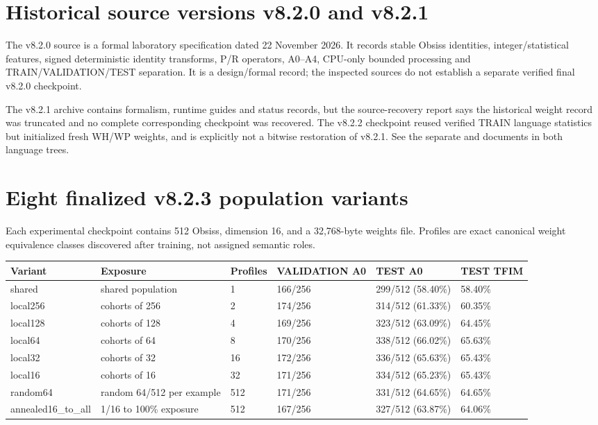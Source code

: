 \documentclass[11pt,a4paper]{report}
\newcommand{\code}[1]{\texttt{\detokenize{#1}}}
\begin{document}
\section{Historical source versions v8.2.0 and v8.2.1}
The v8.2.0 source is a formal laboratory specification dated 22 November 2026. It records stable Obsiss identities, integer/statistical features, signed deterministic identity transforms, P/R operators, A0--A4, CPU-only bounded processing and TRAIN/VALIDATION/TEST separation. It is a design/formal record; the inspected sources do not establish a separate verified final v8.2.0 checkpoint.

The v8.2.1 archive contains formalism, runtime guides and status records, but the source-recovery report says the historical weight record was truncated and no complete corresponding checkpoint was recovered. The v8.2.2 checkpoint reused verified TRAIN language statistics but initialized fresh WH/WP weights, and is explicitly not a bitwise restoration of v8.2.1. See the separate \code{models/eSonde_v8_2_0/} and \code{models/eSonde_v8_2_1/} documents in both language trees.

\section{Eight finalized v8.2.3 population variants}
Each experimental checkpoint contains 512 Obsiss, dimension 16, and a 32,768-byte weights file. Profiles are exact canonical weight equivalence classes discovered after training, not assigned semantic roles.
\begin{longtable}{p{2.8cm}p{3.0cm}p{1.9cm}p{1.9cm}p{1.9cm}p{1.7cm}}
\toprule
Variant & Exposure & Profiles & VALIDATION A0 & TEST A0 & TEST TFIM\\
\midrule
shared & shared population & 1 & 166/256 & 299/512 (58.40\%) & 58.40\%\\
local256 & cohorts of 256 & 2 & 174/256 & 314/512 (61.33\%) & 60.35\%\\
local128 & cohorts of 128 & 4 & 169/256 & 323/512 (63.09\%) & 64.45\%\\
local64 & cohorts of 64 & 8 & 170/256 & 338/512 (66.02\%) & 65.63\%\\
local32 & cohorts of 32 & 16 & 172/256 & 336/512 (65.63\%) & 65.43\%\\
local16 & cohorts of 16 & 32 & 171/256 & 334/512 (65.23\%) & 65.43\%\\
random64 & random 64/512 per example & 512 & 171/256 & 331/512 (64.65\%) & 64.65\%\\
annealed16\_to\_all & 1/16 to 100\% exposure & 512 & 167/256 & 327/512 (63.87\%) & 64.06\%\\
\bottomrule
\end{longtable}
\end{document}
